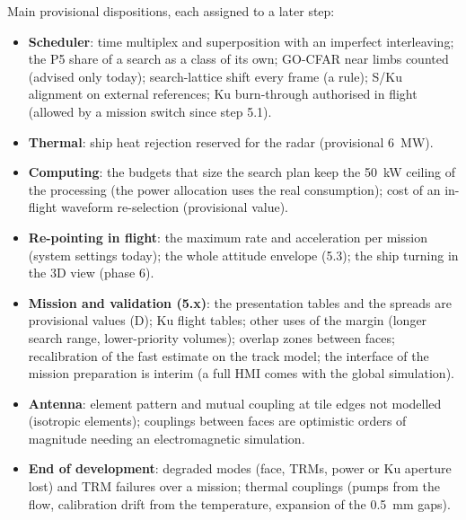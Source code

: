 \documentclass[11pt,a4paper]{article}
\begin{document}
Main provisional dispositions, each assigned to a later step:
\begin{itemize}
  \item \textbf{Scheduler}: time multiplex and superposition with an imperfect interleaving; the P5 share of a search
        as a class of its own; GO-CFAR near limbs counted (advised only today); search-lattice
        shift every frame (a rule); S/Ku alignment on external references; Ku burn-through authorised in flight (allowed by a mission switch since step 5.1).
  \item \textbf{Thermal}: ship heat rejection reserved for the radar (provisional \SI{6}{MW}).
  \item \textbf{Computing}: the budgets that size the search plan keep the \SI{50}{kW} ceiling of the processing (the
        power allocation uses the real consumption); cost of an in-flight waveform re-selection (provisional value).
  \item \textbf{Re-pointing in flight}: the maximum rate and acceleration per mission (system settings today); the
        whole attitude envelope (5.3); the ship turning in the 3D view (phase 6).
  \item \textbf{Mission and validation (5.x)}: the presentation tables and the spreads are provisional values (D);
        Ku flight tables; other uses of the margin (longer search range, lower-priority volumes); overlap zones
        between faces; recalibration of the fast estimate on the track model;
        the interface of the mission preparation is interim (a full HMI comes with the global simulation).
  \item \textbf{Antenna}: element pattern and mutual coupling at tile edges not modelled (isotropic elements);
        couplings between faces are optimistic orders of magnitude needing an electromagnetic simulation.
  \item \textbf{End of development}: degraded modes (face, TRMs, power or Ku aperture lost) and TRM failures over a
        mission; thermal couplings (pumps from the flow, calibration drift from the temperature, expansion of the
        \SI{0.5}{mm} gaps).
\end{itemize}

\appendix
\end{document}
